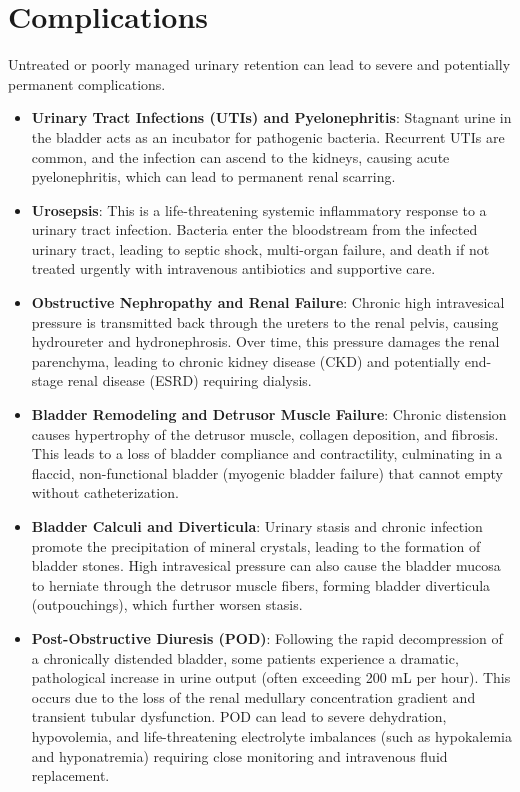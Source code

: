 \section*{Complications}
Untreated or poorly managed urinary retention can lead to severe and potentially permanent complications.
\begin{itemize}
    \item \textbf{Urinary Tract Infections (UTIs) and Pyelonephritis}: Stagnant urine in the bladder acts as an incubator for pathogenic bacteria. Recurrent UTIs are common, and the infection can ascend to the kidneys, causing acute pyelonephritis, which can lead to permanent renal scarring.
    \item \textbf{Urosepsis}: This is a life-threatening systemic inflammatory response to a urinary tract infection. Bacteria enter the bloodstream from the infected urinary tract, leading to septic shock, multi-organ failure, and death if not treated urgently with intravenous antibiotics and supportive care.
    \item \textbf{Obstructive Nephropathy and Renal Failure}: Chronic high intravesical pressure is transmitted back through the ureters to the renal pelvis, causing hydroureter and hydronephrosis. Over time, this pressure damages the renal parenchyma, leading to chronic kidney disease (CKD) and potentially end-stage renal disease (ESRD) requiring dialysis.
    \item \textbf{Bladder Remodeling and Detrusor Muscle Failure}: Chronic distension causes hypertrophy of the detrusor muscle, collagen deposition, and fibrosis. This leads to a loss of bladder compliance and contractility, culminating in a flaccid, non-functional bladder (myogenic bladder failure) that cannot empty without catheterization.
    \item \textbf{Bladder Calculi and Diverticula}: Urinary stasis and chronic infection promote the precipitation of mineral crystals, leading to the formation of bladder stones. High intravesical pressure can also cause the bladder mucosa to herniate through the detrusor muscle fibers, forming bladder diverticula (outpouchings), which further worsen stasis.
    \item \textbf{Post-Obstructive Diuresis (POD)}: Following the rapid decompression of a chronically distended bladder, some patients experience a dramatic, pathological increase in urine output (often exceeding 200 mL per hour). This occurs due to the loss of the renal medullary concentration gradient and transient tubular dysfunction. POD can lead to severe dehydration, hypovolemia, and life-threatening electrolyte imbalances (such as hypokalemia and hyponatremia) requiring close monitoring and intravenous fluid replacement.
\end{itemize}

